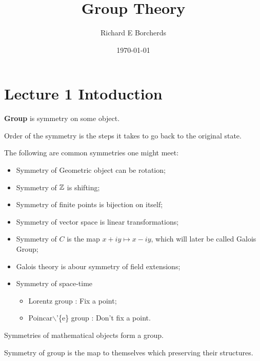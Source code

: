 \documentclass[11pt]{article}
\author{Richard E Borcherds}
\date{\today}
\title{Group Theory}
\begin{document}
\maketitle
\tableofcontents

\section{Lecture 1 Intoduction}
\label{sec:orgfd7c877}

\begin{definition}
\textbf{Group} is symmetry on some object.
\end{definition}

\begin{definition}
Order of the symmetry is the steps it takes to go back to the original state.
\end{definition}

\begin{examplle}
The following are common symmetries one might meet:

\begin{itemize}
\item Symmetry of Geometric object can be rotation;
\item Symmetry of \(\mathbb{Z}\) is shifting;
\item Symmetry of finite points is bijection on itself;
\item Symmetry of vector space is linear transformations;
\item Symmetry of \(C\) is the map \(x + iy \mapsto x - iy\), which will later be called Galois Group;
\item Galois theory is abour symmetry of field extensions;
\item Symmetry of space-time
\begin{itemize}
\item Lorentz group : Fix a point;
\item Poincar$\backslash$'\{e\} group : Don't fix a point.
\end{itemize}
\end{itemize}
\end{examplle}

\begin{definition}
Symmetries of mathematical objects form a group.
\end{definition}

\begin{definition}
Symmetry of group is the map to themselves which preserving their structures.
\end{definition}
\end{document}
